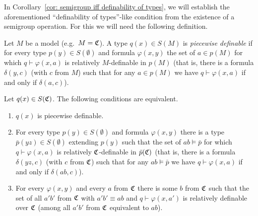 	In Corollary~\ref{cor: semigroup iff definability of types}, we will establish the aforementioned ``definability of types''-like condition from the existence of a semigroup operation.
	For this we will need the following definition.
	
	
	\begin{dfn}
		Let $M$ be a model (e.g.\ $M={\mathfrak C}$). A type $q(x) \in S(M)$ is {\em piecewise definable} if for every type $p(y)\in S(\emptyset)$ and formula $\varphi(x,y)$ the set of $a \in p(M)$ for which $q\vdash \varphi(x,a)$ is relatively $M$-definable in $p(M)$ (that is, there is a formula $\delta(y,c)$ (with $c$ from $M$) such that for any $a\in p(M)$ we have $q\vdash \varphi(x,a)$ if and only if $\delta(a,c)$).\xqed{\lozenge}
	\end{dfn}
	
	
	\begin{rem}\label{remark: piecewise weak definability equals piecewise definability}
		Let $q(x) \in S({\mathfrak C})$. The following conditions are equivalent.
		\begin{enumerate}
			\item $q(x)$ is piecewise definable.
			\item For every type $p(y)\in S(\emptyset)$ and formula $\varphi(x,y)$ there is a type $\bar p(yz) \in S(\emptyset)$ extending $p(y)$ such that the set of $ab \models \bar p$ for which $q\vdash \varphi(x,a)$ is relatively ${\mathfrak C}$-definable in $\bar p({\mathfrak C})$ (that is, there is a formula $\delta(yz,c)$ (with $c$ from ${\mathfrak C}$) such that for any $ab \models \bar p$ we have $q\vdash \varphi(x,a)$ if and only if $\delta(ab,c)$).
			\item For every $\varphi(x,y)$ and every $a$ from ${\mathfrak C}$ there is some $b$ from ${\mathfrak C}$ such that the set of all $a'b'$ from ${\mathfrak C}$ with $a'b'\equiv ab$ and $q\vdash \varphi(x,a')$ is relatively definable over ${\mathfrak C}$ (among all $a'b'$ from ${\mathfrak C}$ equivalent to $ab$).
		\end{enumerate}\xqed{\lozenge}
	\end{rem}
	
